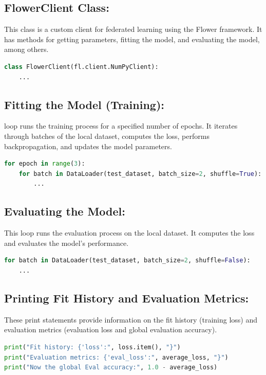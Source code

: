 \documentclass{article}
\begin{document}
\subsection{FlowerClient Class:}
This class is a custom client for federated learning using the Flower framework. It has methods for getting parameters, fitting the model, and evaluating the model, among others.

\begin{lstlisting}[language=Python]
class FlowerClient(fl.client.NumPyClient):
    ...
\end{lstlisting}

\subsection{Fitting the Model (Training):}
loop runs the training process for a specified number of epochs. It iterates through batches of the local dataset, computes the loss, performs backpropagation, and updates the model parameters.

\begin{lstlisting}[language=Python]
for epoch in range(3):
    for batch in DataLoader(test_dataset, batch_size=2, shuffle=True):
        ...
\end{lstlisting}

\subsection{Evaluating the Model:}
This loop runs the evaluation process on the local dataset. It computes the loss and evaluates the model's performance.

\begin{lstlisting}[language=Python]
for batch in DataLoader(test_dataset, batch_size=2, shuffle=False):
    ...
\end{lstlisting}

\subsection{Printing Fit History and Evaluation Metrics:}
These print statements provide information on the fit history (training loss) and evaluation metrics (evaluation loss and global evaluation accuracy).

\begin{lstlisting}[language=Python]
print("Fit history: {'loss':", loss.item(), "}")
print("Evaluation metrics: {'eval_loss':", average_loss, "}")
print("Now the global Eval accuracy:", 1.0 - average_loss)
\end{lstlisting}
\end{document}
